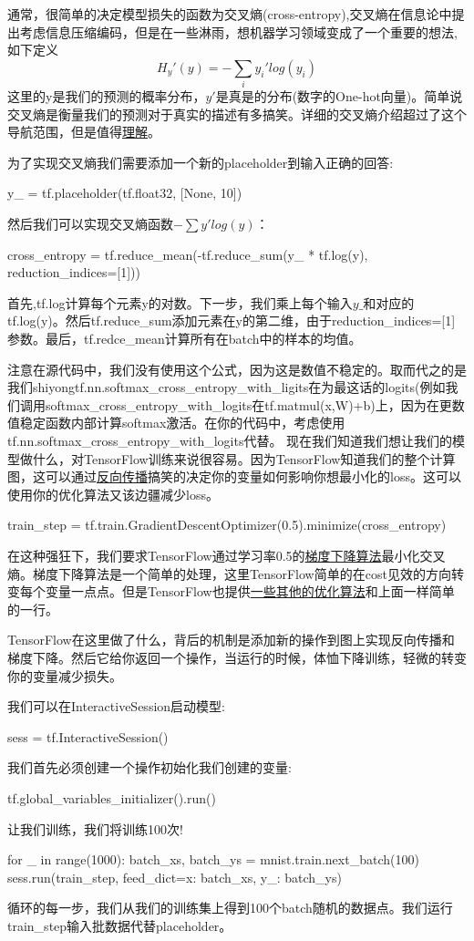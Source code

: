 通常，很简单的决定模型损失的函数为交叉熵(cross-entropy),交叉熵在信息论中提出考虑信息压缩编码，但是在一些淋雨，想机器学习领域变成了一个重要的想法,如下定义
\[H_y'(y)=-\sum_iy_i'log(y_i)\]
这里的y是我们的预测的概率分布，$y'$是真是的分布(数字的One-hot向量)。简单说交叉熵是衡量我们的预测对于真实的描述有多搞笑。详细的交叉熵介绍超过了这个导航范围，但是值得\href{https://colah.github.io/posts/2015-09-Visual-Information}{理解}。

为了实现交叉熵我们需要添加一个新的placeholder到输入正确的回答:
\begin{pythoncode}
y_ = tf.placeholder(tf.float32, [None, 10])
\end{pythoncode}
然后我们可以实现交叉熵函数$-\sum y'log(y)$：
\begin{pythoncode}
cross_entropy = tf.reduce_mean(-tf.reduce_sum(y_ * tf.log(y), reduction_indices=[1]))
\end{pythoncode}
首先,tf.log计算每个元素y的对数。下一步，我们乘上每个输入$y\_$和对应的tf.log(y)。然后tf.reduce\_sum添加元素在y的第二维，由于reduction\_indices=[1]参数。最后，tf.redce\_mean计算所有在batch中的样本的均值。

注意在源代码中，我们没有使用这个公式，因为这是数值不稳定的。取而代之的是我们shiyongtf.nn.softmax\_cross\_entropy\_with\_ligits在为最这话的logits(例如我们调用softmax\_cross\_entropy\_with\_logits在tf.matmul(x,W)+b)上，因为在更数值稳定函数内部计算softmax激活。在你的代码中，考虑使用tf.nn.softmax\_cross\_entropy\_with\_logits代替。
现在我们知道我们想让我们的模型做什么，对TensorFlow训练来说很容易。因为TensorFlow知道我们的整个计算图，这可以通过\href{https://colah.github.io/posts/2015-08-Backprop}{反向传播}搞笑的决定你的变量如何影响你想最小化的loss。这可以使用你的优化算法又该边疆减少loss。
\begin{pythoncode}
train_step = tf.train.GradientDescentOptimizer(0.5).minimize(cross_entropy)
\end{pythoncode}
在这种强狂下，我们要求TensorFlow通过学习率0.5的\href{https://en.wikipedia.org/wiki/Gradient_descent}{梯度下降算法}最小化交叉熵。梯度下降算法是一个简单的处理，这里TensorFlow简单的在cost见效的方向转变每个变量一点点。但是TensorFlow也提供\href{https://www.tensorflow.org/api_guides/python/train#Optimizers}{一些其他的优化算法}和上面一样简单的一行。

TensorFlow在这里做了什么，背后的机制是添加新的操作到图上实现反向传播和梯度下降。然后它给你返回一个操作，当运行的时候，体恤下降训练，轻微的转变你的变量减少损失。

我们可以在InteractiveSession启动模型:
\begin{pythoncode}
sess = tf.InteractiveSession()
\end{pythoncode}
我们首先必须创建一个操作初始化我们创建的变量:
\begin{pythoncode}
tf.global_variables_initializer().run()
\end{pythoncode}
让我们训练，我们将训练100次!
\begin{pythoncode}
for _ in range(1000):
  batch_xs, batch_ys = mnist.train.next_batch(100)
	  sess.run(train_step, feed_dict={x: batch_xs, y_: batch_ys})
\end{pythoncode}
循环的每一步，我们从我们的训练集上得到100个batch随机的数据点。我们运行train\_step输入批数据代替placeholder。

